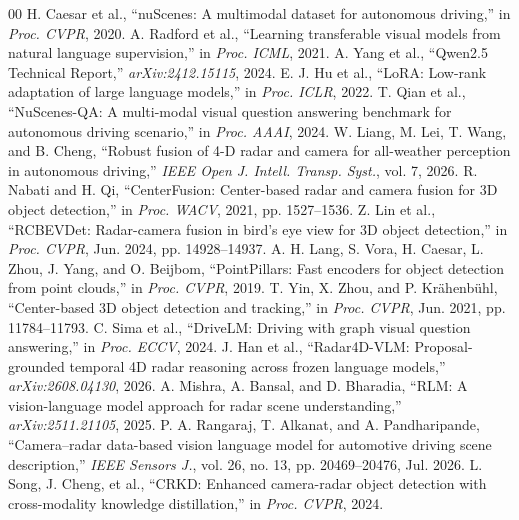 \documentclass[conference]{IEEEtran}
\begin{document}
\begin{thebibliography}{00}
 H. Caesar et al., ``nuScenes: A multimodal dataset for autonomous driving,'' in
\emph{Proc. CVPR}, 2020.
 A. Radford et al., ``Learning transferable visual models from natural language
supervision,'' in \emph{Proc. ICML}, 2021.
 A. Yang et al., ``Qwen2.5 Technical Report,'' \emph{arXiv:2412.15115}, 2024.
 E. J. Hu et al., ``LoRA: Low-rank adaptation of large language models,'' in \emph{Proc.
ICLR}, 2022.
 T. Qian et al., ``NuScenes-QA: A multi-modal visual question answering benchmark for
autonomous driving scenario,'' in \emph{Proc. AAAI}, 2024.
 W. Liang, M. Lei, T. Wang, and B. Cheng, ``Robust fusion of 4-D radar and camera for
all-weather perception in autonomous driving,'' \emph{IEEE Open J. Intell. Transp. Syst.}, vol. 7, 2026.
 R. Nabati and H. Qi, ``CenterFusion: Center-based radar and camera fusion for 3D
object detection,'' in \emph{Proc. WACV}, 2021, pp. 1527--1536.
 Z. Lin et al., ``RCBEVDet: Radar-camera fusion in bird's eye view for 3D object
detection,'' in \emph{Proc. CVPR}, Jun. 2024, pp. 14928--14937.
 A. H. Lang, S. Vora, H. Caesar, L. Zhou, J. Yang, and O. Beijbom, ``PointPillars:
Fast encoders for object detection from point clouds,'' in \emph{Proc. CVPR}, 2019.
 T. Yin, X. Zhou, and P. Kr\"ahenb\"uhl, ``Center-based 3D object detection and
tracking,'' in \emph{Proc. CVPR}, Jun. 2021, pp. 11784--11793.
 C. Sima et al., ``DriveLM: Driving with graph visual question answering,'' in
\emph{Proc. ECCV}, 2024.
 J. Han et al., ``Radar4D-VLM: Proposal-grounded temporal 4D radar reasoning across
frozen language models,'' \emph{arXiv:2608.04130}, 2026.
 A. Mishra, A. Bansal, and D. Bharadia, ``RLM: A vision-language model approach for radar
scene understanding,'' \emph{arXiv:2511.21105}, 2025.
 P. A. Rangaraj, T. Alkanat, and A. Pandharipande, ``Camera--radar data-based vision
language model for automotive driving scene description,'' \emph{IEEE Sensors J.}, vol. 26, no. 13,
pp. 20469--20476, Jul. 2026.
 L. Song, J. Cheng, et al., ``CRKD: Enhanced camera-radar object detection with
cross-modality knowledge distillation,'' in \emph{Proc. CVPR}, 2024.
\end{thebibliography}
\end{document}
